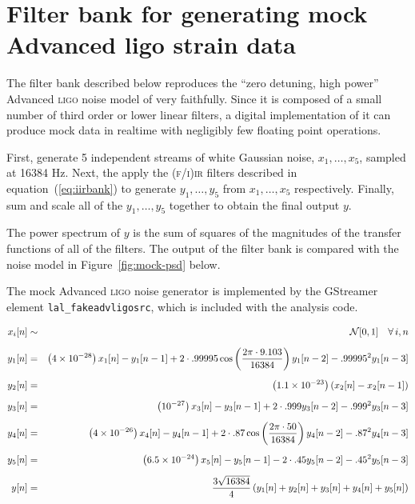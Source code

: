 \section{Filter bank for generating mock Advanced {\sc ligo} strain data}
\label{appendix:mock-data}

The filter bank described below reproduces the ``zero detuning, high power'' Advanced \textsc{ligo} noise model of  \cite{Shoemaker:2009p9770} very faithfully.  Since it is composed of a small number of third order or lower linear filters, a digital implementation of it can produce mock data in realtime with negligibly few floating point operations.

First, generate 5 independent streams of white Gaussian noise, $x_1, \dots, x_5$, sampled at 16384 Hz.  Next, the apply the (\textsc{f}/\textsc{i})\textsc{ir} filters described in equation~(\ref{eq:iirbank}) to generate $y_1, \dots, y_5$ from $x_1, \dots, x_5$ respectively.  Finally, sum and scale all of the $y_1, \dots, y_5$ together to obtain the final output $y$.

The power spectrum of $y$ is the sum of squares of the magnitudes of the transfer functions of all of the filters.  The output of the filter bank is compared with the noise model in Figure~\ref{fig:mock-psd} below.

The mock Advanced \textsc{ligo} noise generator is implemented by the GStreamer element \texttt{lal\_fakeadvligosrc}, which is included with the analysis code.

\begin{eqnarray}
\label{eq:iirbank}
x_i &[n] \sim& \mathcal{N}[0, 1] \quad \forall \, i, n \nonumber\\\noalign{\vskip 2mm}
y_1 &[n] =& \left(4 \times 10^{-28}\right) x_1[n] - y_1[n-1] + 2 \cdot .99995 \cos \left(\frac{2\pi \cdot 9.103}{16384}\right) y_1[n-2] - .99995^2 y_1[n-3] \nonumber\\\noalign{\vskip 2mm}
y_2 &[n] =& \left(1.1 \times 10^{-23}\right) (x_2[n] - x_2[n-1]) \nonumber\\\noalign{\vskip 2mm}
y_3 &[n] =& \left(10^{-27}\right) x_3[n] - y_3[n-1] + 2 \cdot .999 y_3[n-2] - .999^2 y_3[n-3] \nonumber\\\noalign{\vskip 2mm}
y_4 &[n] =& \left(4 \times 10^{-26}\right) x_4[n] - y_4[n-1] + 2 \cdot .87 \cos \left(\frac{2\pi \cdot 50}{16384}\right) y_4[n-2] - .87 ^ 2 y_4[n-3] \nonumber\\\noalign{\vskip 2mm}
y_5 &[n] =& \left(6.5 \times 10^{-24}\right) x_5[n] - y_5[n-1] - 2 \cdot .45 y_5[n-2] - .45 ^ 2 y_5[n-3] \nonumber\\\noalign{\vskip 2mm}
\; y &[n] =& \frac{3\sqrt{16384}}{4} \left(y_1[n] + y_2[n] + y_3[n] + y_4[n] + y_5[n]\right)
\end{eqnarray}


